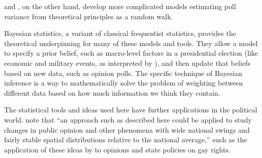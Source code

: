\documentclass[thesis.tex]{subfiles}
\begin{document}
\citet{Strauss:2007aa} and \citet{Jackman:2005aa}, on the other hand, develop more complicated models estimating poll variance from theoretical principles as a random walk.

Bayesian statistics, a variant of classical frequentist statistics, provides the theoretical underpinning for many of these models and tools. They allow a model to specify a prior belief, such as macro-level factors in a presidential election (like economic and military events, as interpreted by \citealt{Hibbs:2008aa}), and then update that beliefs based on new data, such as opinion polls. The specific technique of Bayesian inference is a way to mathematically solve the problem of weighting between different data based on how much information we think they contain.

The statistical tools and ideas used here have further applications in the political world. \citet{Lock:2010aa} note that ``an approach such as described here could be applied to study changes in public opinion and other phenomena with wide national swings and fairly stable spatial distributions relative to the national average,'' such as the application of these ideas by \citet{Lax:2009aa} to opinions and state policies on gay rights.

\begin{comment}

Other models incorporate more arcane techniques to, for example, examine voting turnout among demographic groups \citep{Ghitza:2013aa}, an important piece of information for political campaigns.

\textbf{How does it work?} Basic information ahead of time (what's the economy like? How many people are dying?) Incorporate opinion polls. Estimate state outcomes (the electoral college).

\end{comment}
\end{document}
